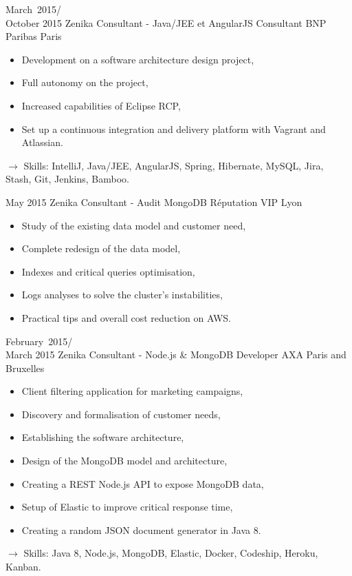 \documentclass[11pt,a4paper,sans]{moderncv}
\begin{document}
\cventry
{March\ 2015/\\October 2015}
{Zenika Consultant - Java/JEE et AngularJS Consultant}
{BNP Paribas}
{Paris}
{}
{\begin{itemize}
    \item Development on a software architecture design project,
    \item Full autonomy on the project,
    \item Increased capabilities of Eclipse RCP,
    \item Set up a continuous integration and delivery platform with Vagrant and Atlassian.
\end{itemize}
$\rightarrow$ Skills: IntelliJ, Java/JEE, AngularJS, Spring, Hibernate, MySQL, Jira, Stash, Git, Jenkins, Bamboo.
}   %

\cventry
{May 2015}
{Zenika Consultant - Audit MongoDB}
{Réputation VIP}
{Lyon}
{}
{\begin{itemize}
    \item Study of the existing data model and customer need,
    \item Complete redesign of the data model,
    \item Indexes and critical queries optimisation,
    \item Logs analyses to solve the cluster's instabilities,
    \item Practical tips and overall cost reduction on AWS.
\end{itemize}
}   %

\cventry
{February\ 2015/\\March 2015}
{Zenika Consultant - Node.js \& MongoDB Developer}
{AXA}
{Paris and Bruxelles}
{}
{\begin{itemize}
    \item Client filtering application for marketing campaigns,
    \item Discovery and formalisation of customer needs,
    \item Establishing the software architecture,
    \item Design of the MongoDB model and architecture,
    \item Creating a REST Node.js API to expose MongoDB data,
    \item Setup of Elastic to improve critical response time,
    \item Creating a random JSON document generator in Java 8.
\end{itemize}
$\rightarrow$ Skills: Java 8, Node.js, MongoDB, Elastic, Docker, Codeship, Heroku, Kanban.
}   %
\end{document}

